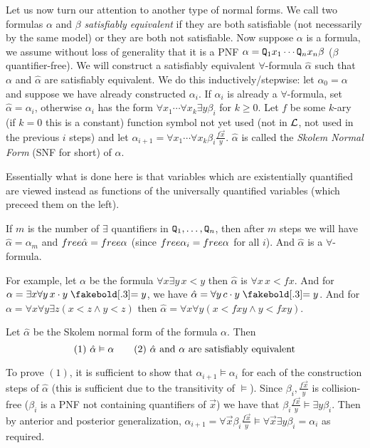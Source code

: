 Let us now turn our attention to another type of normal forms.
We call two formulas $\alpha$ and $\beta$ {\it satisfiably equivalent} if they are both satisfiable (not necessarily by the same model) or they are both not satisfiable.
Now suppose $\alpha$ is a formula, we assume without loss of generality that it is a PNF $\alpha={\tt Q}_1x_1\cdots{\tt Q}_nx_n\beta$ ($\beta$ quantifier-free).
We will construct a satisfiably equivalent $\forall$-formula $\hat\alpha$ such that $\alpha$ and $\hat\alpha$ are satisfiably equivalent.
We do this inductively/stepwise: let $\alpha_0=\alpha$ and suppose we have already constructed $\alpha_i$.
If $\alpha_i$ is already a $\forall$-formula, set $\hat\alpha=\alpha_i$, otherwise $\alpha_i$ has the form $\forall x_1\cdots\forall x_k\exists y\beta_i$ for $k\geq0$.
Let $f$ be some $k$-ary (if $k=0$ this is a constant) function symbol not yet used (not in ${\cal L}$, not used in the previous $i$ steps) and let
$\alpha_{i+1}=\forall x_1\cdots\forall x_k\beta_i\frac{f\vec x}y$.
$\hat\alpha$ is called the {\it Skolem Normal Form} (SNF for short) of $\alpha$.

Essentially what is done here is that variables which are existentially quantified are viewed instead as functions of the universally quantified variables (which preceed them on the left).

If $m$ is the number of $\exists$ quantifiers in ${\tt Q}_1,\dots,{\tt Q}_n$, then after $m$ steps we will have $\hat\alpha=\alpha_m$ and ${\sl free}\hat\alpha={\sl free}\alpha$ (since ${\sl free}\alpha_i={\sl free}\alpha$ for all $i$).
And $\hat\alpha$ is a $\forall$-formula.

For example, let $\alpha$ be the formula $\forall x\exists y\,x<y$ then $\hat\alpha$ is $\forall x\,x<fx$.
And for $\alpha=\exists x\forall y\,x\cdot y\eq y$, we have $\hat\alpha=\forall y\,c\cdot y\eq y$.
And for $\alpha=\forall x\forall y\exists z(x<z\land y<z)$ then $\hat\alpha=\forall x\forall y(x<fxy\land y<fxy)$.

\bthrm

    Let $\hat\alpha$ be the Skolem normal form of the formula $\alpha$.
    Then
    $$ (1)\ \hat\alpha\vDash\alpha\qquad (2)\ \hbox{$\hat\alpha$ and $\alpha$ are satisfiably equivalent} $$

\ethrm

To prove $(1)$, it is sufficient to show that $\alpha_{i+1}\vDash\alpha_i$ for each of the construction steps of $\hat\alpha$ (this is sufficient due to the transitivity of $\vDash$).
Since $\beta_i,\frac{f\vec x}y$ is collision-free ($\beta_i$ is a PNF not containing quantifiers of $\vec x$) we have that $\beta_i\frac{f\vec x}y\vDash\exists y\beta_i$.
Then by anterior and posterior generalization, $\alpha_{i+1}=\forall\vec x\beta_i\frac{f\vec x}y\vDash\forall\vec x\exists y\beta_i=\alpha_i$ as required.

